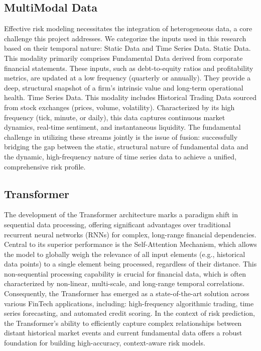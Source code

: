 \subsection{MultiModal Data}
Effective risk modeling necessitates the integration of heterogeneous data, a core challenge this project addresses. We categorize the inputs used in this research based on their temporal nature: Static Data and Time Series Data.
Static Data. This modality primarily comprises Fundamental Data derived from corporate financial statements. These inputs, such as debt-to-equity ratios and profitability metrics, are updated at a low frequency (quarterly or annually). They provide a deep, structural snapshot of a firm’s intrinsic value and long-term operational health.
Time Series Data. This modality includes Historical Trading Data sourced from stock exchanges (prices, volume, volatility). Characterized by its high frequency (tick, minute, or daily), this data captures continuous market dynamics, real-time sentiment, and instantaneous liquidity.
The fundamental challenge in utilizing these streams jointly is the issue of fusion: successfully bridging the gap between the static, structural nature of fundamental data and the dynamic, high-frequency nature of time series data to achieve a unified, comprehensive risk profile.

\subsection{Transformer}
The development of the Transformer architecture marks a paradigm shift in sequential data processing, offering significant advantages over traditional recurrent neural networks (RNNs) for complex, long-range financial dependencies. Central to its superior performance is the Self-Attention Mechanism, which allows the model to globally weigh the relevance of all input elements (e.g., historical data points) to a single element being processed, regardless of their distance. This non-sequential processing capability is crucial for financial data, which is often characterized by non-linear, multi-scale, and long-range temporal correlations. Consequently, the Transformer has emerged as a state-of-the-art solution across various FinTech applications, including: high-frequency algorithmic trading, time series forecasting, and automated credit scoring. In the context of risk prediction, the Transformer’s ability to efficiently capture complex relationships between distant historical market events and current fundamental data offers a robust foundation for building high-accuracy, context-aware risk models.

